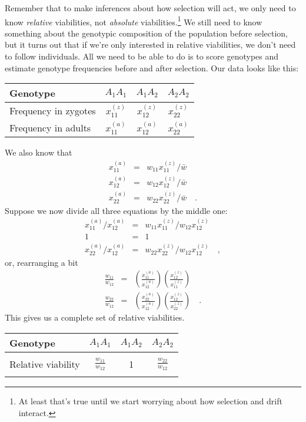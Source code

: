 Remember that to make inferences about how selection will act, we only
need to know {\it relative\/} viabilities, not {\it absolute\/}
viabilities.\footnote{At least that's true until we start worrying
  about how selection and drift interact.} We still need to know
something about the genotypic composition of the population before
selection, but it turns out that if we're only interested in relative
viabilities, we don't need to follow individuals. All we need to be
able to do is to score genotypes and estimate genotype frequencies
before and after selection. Our data looks like this:
\begin{center}
\begin{tabular}{l|ccc}
\hline\hline
Genotype & $A_1A_1$ & $A_1A_2$ & $A_2A_2$ \\
\hline
Frequency in zygotes & $x_{11}^{(z)}$ & $x_{12}^{(z)}$ &
$x_{22}^{(z)}$ \\
Frequency in adults  & $x_{11}^{(a)}$ & $x_{12}^{(a)}$ &
$x_{22}^{(a)}$ \\
\hline
\end{tabular}
\end{center}
We also know that
\begin{eqnarray*}
x_{11}^{(a)} &=& w_{11}x_{11}^{(z)}/\bar w \\
x_{12}^{(a)} &=& w_{12}x_{12}^{(z)}/\bar w \\
x_{22}^{(a)} &=& w_{22}x_{22}^{(z)}/\bar w \quad .
\end{eqnarray*}
Suppose we now divide all three equations by the middle one:
\begin{eqnarray*}
x_{11}^{(a)}/x_{12}^{(a)} &=& w_{11}x_{11}^{(z)}/w_{12}x_{12}^{(z)} \\
1 &=& 1 \\
x_{22}^{(a)}/x_{12}^{(a)} &=& w_{22}x_{22}^{(z)}/w_{12}x_{12}^{(z)} \quad ,
\end{eqnarray*}
or, rearranging a bit
\begin{eqnarray}
\frac{w_{11}}{w_{12}} &=& \left(\frac{x_{11}^{(a)}}{x_{12}^{(a)}}\right)
                          \left(\frac{x_{12}^{(z)}}{x_{11}^{(z)}}\right) 
\label{eq:est-rel-viability-1}
\\
\frac{w_{22}}{w_{12}} &=& \left(\frac{x_{22}^{(a)}}{x_{12}^{(a)}}\right)
                          \left(\frac{x_{12}^{(z)}}{x_{22}^{(z)}}\right)
\quad . \label{eq:est-rel-viability-2}
\end{eqnarray}
This gives us a complete set of relative viabilities.
\begin{center}
\begin{tabular}{l|ccc}
\hline\hline
Genotype & $A_1A_1$ & $A_1A_2$ & $A_2A_2$ \\
\hline
\\
Relative viability & $\frac{w_{11}}{w_{12}}$ & 1 &
$\frac{w_{22}}{w_{12}}$ \\
\\
\hline
\end{tabular}
\end{center}

